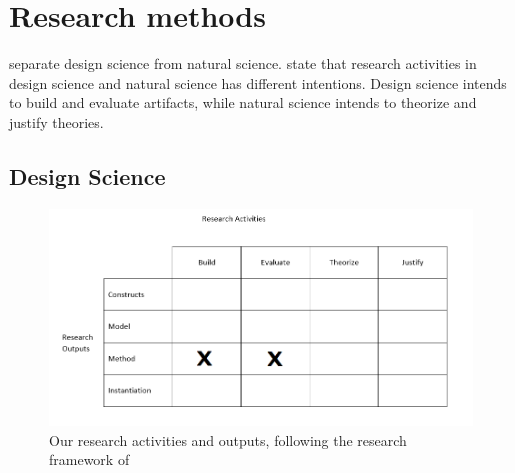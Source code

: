 \section{Research methods}

\citet{simon1996sciences} separate design science from natural science.
\citet{march1995design} state that research activities in design science and natural science has different intentions. Design science intends to build and evaluate artifacts, while natural science intends to theorize and justify theories.

\subsection{Design Science}



\begin{figure}[h]
	\centering
	\includegraphics[width=1\linewidth]{"Figures/design science figur"}
	\caption[Research framework]{Our research activities and outputs, following the research framework of \citet{march1995designfigure}}
	\label{fig:design-science-figur}
\end{figure}

